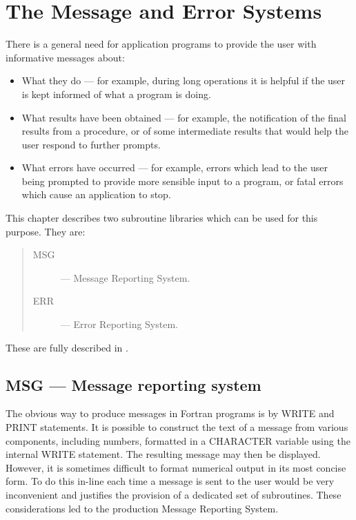 \chapter{The Message and Error Systems}
\label{C_messerrs}

There is a general need for application programs to provide the user with
informative messages about:

\begin {itemize}
\item What they do --- for example, during long operations it is helpful if the
 user is kept informed of what a program is doing.
\item What results have been obtained --- for example, the notification of  the
 final results from a procedure, or of some intermediate results that would help
 the user respond to further prompts. 
\item What errors have occurred --- for example, errors which lead to the user
 being prompted to provide more sensible input to a program, or fatal errors
 which cause an application to stop.
\end {itemize}

This chapter describes two subroutine libraries which can be used for this
purpose.
They are:

\begin{quote}
\begin{description}
\item [MSG] --- Message Reporting System.
\item [ERR] --- Error Reporting System.
\end{description}
\end{quote}

These are fully described in .

\section {MSG --- Message reporting system}

The obvious way to produce messages in Fortran programs is by WRITE and PRINT
statements.
It is possible to construct the text of a message from various components, 
including numbers, formatted in a CHARACTER variable using the internal WRITE
statement. 
The resulting message may then be displayed.
However, it is sometimes difficult to format numerical output in its most
concise form.
To do this in-line each time a message is sent to the user would be very
inconvenient and justifies the provision of a dedicated set of subroutines. 
These considerations led to the production Message Reporting System.

